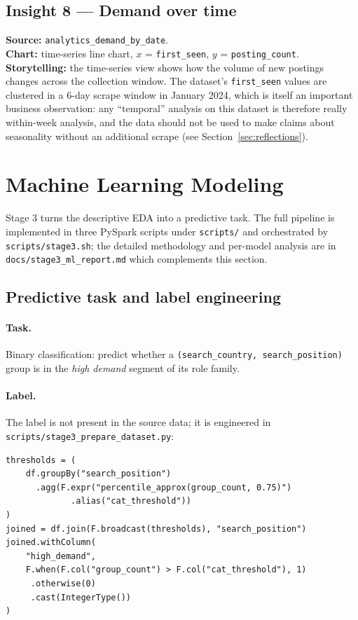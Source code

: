 \documentclass[11pt,a4paper]{article}
\begin{document}
\subsection{Insight 8 --- Demand over time}
\textbf{Source:} \texttt{analytics\_demand\_by\_date}.\\
\textbf{Chart:} time-series line chart, $x$ = \texttt{first\_seen},
$y$ = \texttt{posting\_count}.\\
\textbf{Storytelling:} the time-series view shows how the volume of
new postings changes across the collection window.  The dataset's
\texttt{first\_seen} values are clustered in a 6-day scrape window in
January 2024, which is itself an important business observation: any
``temporal'' analysis on this dataset is therefore really within-week
analysis, and the data should not be used to make claims about
seasonality without an additional scrape (see
Section~\ref{sec:reflections}).

\section{Machine Learning Modeling}
\label{sec:ml}

Stage 3 turns the descriptive EDA into a predictive task.  The full
pipeline is implemented in three PySpark scripts under
\texttt{scripts/} and orchestrated by \texttt{scripts/stage3.sh}; the
detailed methodology and per-model analysis are in
\texttt{docs/stage3\_ml\_report.md} which complements this section.

\subsection{Predictive task and label engineering}
\paragraph{Task.}  Binary classification: predict whether a
\texttt{(search\_country, search\_position)} group is in the
\emph{high demand} segment of its role family.

\paragraph{Label.}  The label is not present in the source data;
it is engineered in
\texttt{scripts/stage3\_prepare\_dataset.py}:

\begin{lstlisting}[style=python,caption={Label engineering: per-position
top-quartile threshold.}]
thresholds = (
    df.groupBy("search_position")
      .agg(F.expr("percentile_approx(group_count, 0.75)")
             .alias("cat_threshold"))
)
joined = df.join(F.broadcast(thresholds), "search_position")
joined.withColumn(
    "high_demand",
    F.when(F.col("group_count") > F.col("cat_threshold"), 1)
     .otherwise(0)
     .cast(IntegerType())
)
\end{lstlisting}
\end{document}
